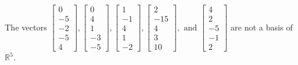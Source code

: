\begin{exercise}
\begin{exerciseStatement}
  \end{exerciseStatement}
  \begin{exerciseAnswer}
   The vectors \(\left[\begin{array}{r}
0 \\
-5 \\
-2 \\
-5 \\
4
\end{array}\right] , \left[\begin{array}{r}
0 \\
4 \\
1 \\
-3 \\
-5
\end{array}\right] , \left[\begin{array}{r}
1 \\
-1 \\
4 \\
1 \\
-2
\end{array}\right] , \left[\begin{array}{r}
2 \\
-15 \\
4 \\
3 \\
10
\end{array}\right] , \text{ and } \left[\begin{array}{r}
4 \\
2 \\
-5 \\
-1 \\
2
\end{array}\right]\) 
  	 are not  a basis of \(\mathbb{R}^5\).
  


  \end{exerciseAnswer}
\end{exercise}
